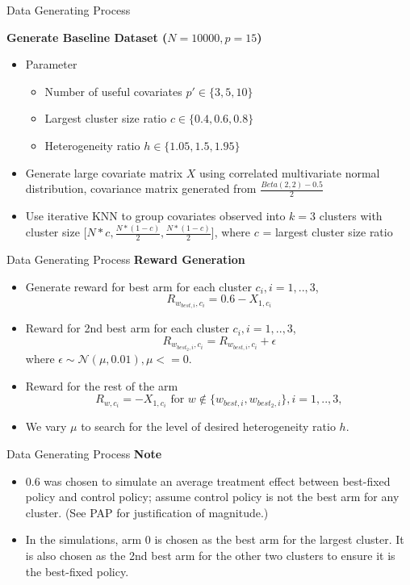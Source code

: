 \documentclass{beamer}
\begin{document}
\begin{frame}{Data Generating Process}

\textbf{Generate Baseline Dataset ($N = 10000, p = 15$)}
\begin{itemize}
    \item Parameter \begin{itemize}
        \item Number of useful covariates $p' \in \{3, 5, 10\}$
        \item Largest cluster size ratio $c \in \{0.4, 0.6, 0.8\}$
        \item Heterogeneity ratio $h \in \{1.05, 1.5, 1.95\}$
    \end{itemize}
    \item Generate large covariate matrix $X$ using correlated multivariate normal distribution, covariance matrix generated from $\frac{Beta(2,2) - 0.5}{2}$
    \item Use iterative KNN to group covariates observed into $k = 3$ clusters with cluster size [$N*c, \frac{N * (1-c)}{2}, \frac{N * (1-c)}{2}$], where $c$ = largest cluster size ratio
    
\end{itemize}

\end{frame}

\begin{frame}{Data Generating Process}
\textbf{Reward Generation}
\begin{itemize}
    \item Generate reward for best arm for each cluster $c_i,  i = 1, .., 3$, $$R_{w_{best, i}, c_i} = 0.6 - X_{1, c_i}$$
    \item Reward for 2nd best arm for each cluster $c_i,  i = 1, .., 3$, $$R_{w_{best_2, i}, c_i} = R_{w_{best, i}, c_i} + \epsilon $$ where $\epsilon \sim \mathcal{N}(\mu, 0.01), \mu <= 0$. 
    \item Reward for the rest of the arm
    $$R_{w, c_i} = -X_{1, c_i} \mbox{ for }  w \not\in \{w_{best, i}, w_{best_2, i}\}, i = 1, .., 3,$$
    \item We vary $\mu$ to search for the level of desired heterogeneity ratio $h$.
\end{itemize}
\end{frame}

\begin{frame}{Data Generating Process}
\textbf{Note}
\begin{itemize}
    \item 0.6 was chosen to simulate an average treatment effect between best-fixed policy and control policy; assume control policy is not the best arm for any cluster. (See PAP for justification of magnitude.)
    \item In the simulations, arm 0 is chosen as the best arm for the largest cluster. It is also chosen as the 2nd best arm for the other two clusters to ensure it is the best-fixed policy.
\end{itemize}
\end{frame}
\end{document}
